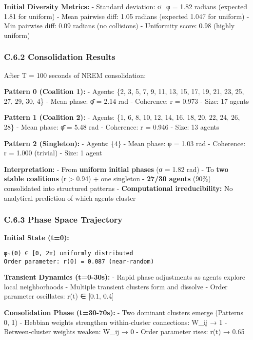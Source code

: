 \documentclass[
]{article}
\begin{document}
\textbf{Initial Diversity Metrics:} - Standard deviation: σ\_φ = 1.82
radians (expected 1.81 for uniform) - Mean pairwise diff: 1.05 radians
(expected 1.047 for uniform) - Min pairwise diff: 0.09 radians (no
collisions) - Uniformity score: 0.98 (highly uniform)

\subsubsection{C.6.2 Consolidation
Results}\label{c.6.2-consolidation-results}

After T = 100 seconds of NREM consolidation:

\textbf{Pattern 0 (Coalition 1):} - Agents: \{2, 3, 5, 7, 9, 11, 13, 15,
17, 19, 21, 23, 25, 27, 29, 30, 4\} - Mean phase: φ̄ = 2.14 rad -
Coherence: r = 0.973 - Size: 17 agents

\textbf{Pattern 1 (Coalition 2):} - Agents: \{1, 6, 8, 10, 12, 14, 16,
18, 20, 22, 24, 26, 28\} - Mean phase: φ̄ = 5.48 rad - Coherence: r =
0.946 - Size: 13 agents

\textbf{Pattern 2 (Singleton):} - Agents: \{4\} - Mean phase: φ̄ = 1.03
rad - Coherence: r = 1.000 (trivial) - Size: 1 agent

\textbf{Interpretation:} - From \textbf{uniform initial phases} (σ =
1.82 rad) - To \textbf{two stable coalitions} (r \textgreater{} 0.94) +
one singleton - \textbf{27/30 agents} (90\%) consolidated into
structured patterns - \textbf{Computational irreducibility:} No
analytical prediction of which agents cluster

\subsubsection{C.6.3 Phase Space
Trajectory}\label{c.6.3-phase-space-trajectory}

\textbf{Initial State (t=0):}

\begin{verbatim}
φᵢ(0) ∈ [0, 2π) uniformly distributed
Order parameter: r(0) = 0.087 (near-random)
\end{verbatim}

\textbf{Transient Dynamics (t=0-30s):} - Rapid phase adjustments as
agents explore local neighborhoods - Multiple transient clusters form
and dissolve - Order parameter oscillates: r(t) ∈ {[}0.1, 0.4{]}

\textbf{Consolidation Phase (t=30-70s):} - Two dominant clusters emerge
(Patterns 0, 1) - Hebbian weights strengthen within-cluster connections:
W\_ij → 1 - Between-cluster weights weaken: W\_ij → 0 - Order parameter
rises: r(t) → 0.65
\end{document}
